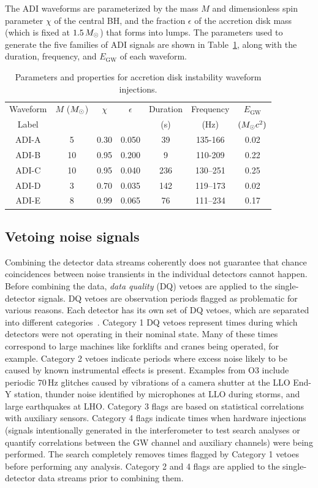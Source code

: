 The ADI waveforms are parameterized by the mass $M$ and dimensionless spin parameter $\chi$ of the central \ac{BH}, and the fraction $\epsilon$ of the  accretion disk mass (which is fixed at $1.5\,M_{\odot}$) that forms into lumps.
The parameters used to generate the five families of \ac{ADI} signals are shown in Table~\ref{tab:adi}, along with the duration, frequency, and $E_{\text{GW}}$ of each waveform.

\begin{table}[h!]
	\centering
	\caption
  {Parameters and properties for accretion disk instability waveform injections.
  \label{tab:adi}}
	\begin{tabular}{c c c c c c c}
		\hline
		Waveform & $M$ ($M_{\odot}$) & $\chi$ & $\epsilon$ & Duration & Frequency & $E_{\text{GW}}$ \\
		Label &  &  &  & (s) & (Hz) & $(M_{\odot} c^2)$ \\
		\hline
  	\hline
    ADI-A & 5 & 0.30 & 0.050 & 39 & 135-166 & 0.02 \\
    ADI-B & 10 & 0.95 & 0.200 & 9 & 110-209 & 0.22 \\
    ADI-C & 10 & 0.95 & 0.040 & 236 & 130–251 & 0.25 \\
    ADI-D & 3 & 0.70 & 0.035 & 142 & 119–173 & 0.02 \\
    ADI-E & 8 & 0.99 & 0.065 & 76 & 111–234 & 0.17 \\
		\hline
	\end{tabular}
\end{table}


\subsection{Vetoing noise signals}

Combining the detector data streams coherently does not guarantee that chance coincidences between noise transients in the individual detectors cannot happen.
Before combining the data, \textit{data quality} (DQ) vetoes are applied to the single-detector signals.
DQ vetoes are observation periods flagged as problematic for various reasons.
Each detector has its own set of DQ vetoes, which are separated into different categories~\citep{Davis_2021, Davis_2021b}.
Category 1 DQ vetoes represent times during which detectors were not operating in their nominal state.
Many of these times correspond to large machines like forklifts and cranes being operated, for example.
Category 2 vetoes indicate periods where excess noise likely to be caused by known instrumental effects is present.
Examples from O3 include periodic 70\,Hz glitches caused by vibrations of a camera shutter at the LLO End-Y station, thunder noise identified by microphones at LLO during storms, and large earthquakes at LHO.
Category 3 flags are based on statistical correlations with auxiliary sensors.
Category 4 flags indicate times when hardware injections (signals intentionally generated in the interferometer to test search analyses or quantify correlations between the GW channel and auxiliary channels) were being performed.
The \xpip search completely removes times flagged by Category 1 vetoes before performing any analysis.
Category 2 and 4 flags are applied to the single-detector data streams prior to combining them.

